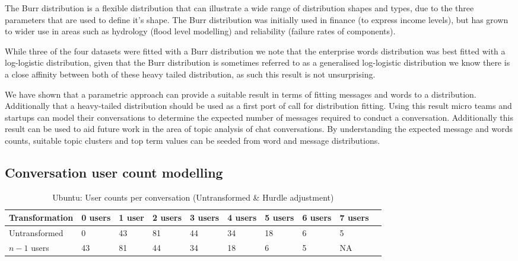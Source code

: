 The Burr distribution is a flexible distribution that can illustrate a wide range of distribution shapes and types, due to the three parameters that are used to define it's shape. The Burr distribution was initially used in finance (to express income levels), but has grown to wider use in areas such as hydrology (flood level modelling) and reliability (failure rates of components). 

While three of the four datasets were fitted with a Burr distribution we note that the enterprise words distribution was best fitted with a log-logistic distribution, given that the Burr distribution is sometimes referred to as a generalised log-logistic distribution we know there is a close affinity between both of these heavy tailed distribution, as such this result is not unsurprising.

We have shown that a parametric approach can provide a suitable result in terms of fitting messages and words to a distribution. Additionally that a heavy-tailed distribution should be used as a first port of call for distribution fitting. Using this result micro teams and startups can model their conversations to determine the expected number of messages required to conduct a conversation. Additionally this result can be used to aid future work in the area of topic analysis of chat conversations. By understanding the expected message and words counts, suitable topic clusters and top term values can be seeded from word and message distributions.

\subsection{Conversation user count modelling}

\begin {table}
\begin{center}
\caption {Ubuntu: User counts per conversation (Untransformed & Hurdle adjustment)} 
\label{tab:chapt6tab5}
\begin{tabular}{| C{3.2cm} | C{0.9cm} | C{0.7cm} | C{0.9cm} | C{0.9cm} | C{0.9cm} | C{0.9cm} | C{0.9cm} | C{0.9cm} | C{0.9cm} |} \hline 
\textbf{Transformation} & \textbf{0 users} & \textbf{1 user} & \textbf{2 users} & \textbf{3 users} & \textbf{4 users} & \textbf{5 users} &  \textbf{6 users} & \textbf{7 users} 
\\ \hline Untransformed & 0 & 43 & 81 & 44 & 34 & 18 & 6 & 5
\\ \hline  $n-1$ users  & 43 & 81 & 44 & 34 & 18 & 6 & 5 & NA
\\ \hline
\end{tabular}
\end{center}
\end{table}


